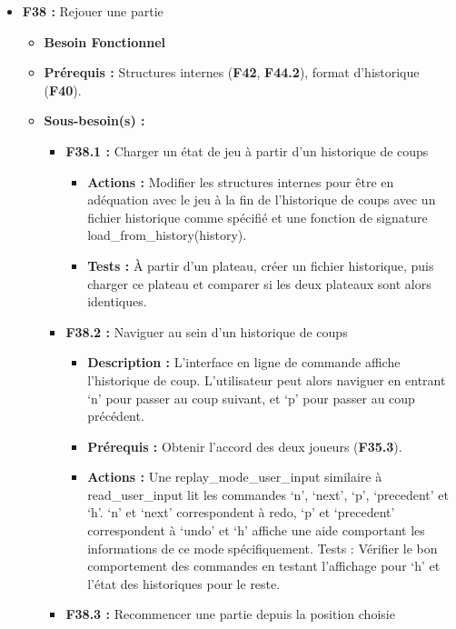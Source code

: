 \documentclass{article}
\begin{document}
\medskip
\begin{itemize}
    \item \textbf{F38 :} Rejouer une partie
    \begin{itemize}
        \item \textbf{Besoin Fonctionnel}
        \item \textbf{Prérequis :} Structures internes (\textbf{F42}, \textbf{F44.2}), format d’historique (\textbf{F40}).
        \item \textbf{Sous-besoin(s) :}
        \begin{itemize}
            \smallskip
            \item \textbf{F38.1 :} Charger un état de jeu à partir d’un historique de coups
            \begin{itemize}
                \item \textbf{Actions :} Modifier les structures internes pour être en adéquation avec le jeu à la fin de l’historique de coups avec un fichier historique comme spécifié et une fonction de signature load\_from\_history(history).
                \item \textbf{Tests :}  À partir d’un plateau, créer un fichier historique, puis charger ce plateau et comparer si les deux plateaux sont alors identiques.  
            \end{itemize}
            \smallskip
            \item \textbf{F38.2 :} Naviguer au sein d’un historique de coups
            \begin{itemize}
                \item \textbf{Description :} L’interface en ligne de commande affiche l’historique de coup. L’utilisateur peut alors naviguer en entrant ‘n’ pour passer au coup suivant, et ‘p’ pour passer au coup précédent.
                \item \textbf{Prérequis :} Obtenir l’accord des deux joueurs (\textbf{F35.3}).
                \item \textbf{Actions :} Une replay\_mode\_user\_input similaire à read\_user\_input lit les commandes ‘n’, ‘next’, ‘p’, ‘precedent’ et ‘h’. ‘n’ et ‘next’ correspondent à redo, ‘p’ et ‘precedent’ correspondent à ‘undo’ et ‘h’ affiche une aide comportant les informations de ce mode spécifiquement.
                Tests : Vérifier le bon comportement des commandes en testant l’affichage pour ‘h’ et l’état des historiques pour le reste.
            \end{itemize}
            \smallskip
            \item \textbf{F38.3 :} Recommencer une partie depuis la position choisie

\end{itemize}
\end{itemize}
\end{itemize}
\end{document}
